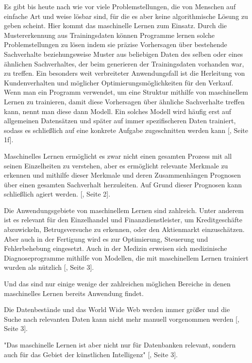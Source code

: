 Es gibt bis heute nach wie vor viele Problemstellungen, die von Menschen auf einfache Art und weise lösbar sind, für die es aber keine algorithmische Lösung zu geben scheint. Hier kommt das maschinelle Lernen zum Einsatz. Durch die Mustererkennung aus Trainingsdaten können Programme lernen solche Problemstellungen zu lösen indem sie präzise Vorhersagen über bestehende Sachverhalte beziehungsweise Muster aus beliebigen Daten des selben oder eines ähnlichen Sachverhaltes, der beim generieren der Trainingsdaten vorhanden war, zu treffen. Ein besonders weit verbreiteter Anwendungsfall ist die Herleitung von Kundenverhalten und möglicher Optimierungsmöglichkeiten für den Verkauf. Wenn man ein Programm verwendet, um eine Struktur mithilfe von maschinellem Lernen zu trainieren, damit diese Vorhersagen über ähnliche Sachverhalte treffen kann, nennt man diese dann Modell. Ein solches Modell wird häufig erst auf allgemeinen Datensätzen und später auf immer spezifischeren Daten trainiert, sodass es schließlich auf eine konkrete Aufgabe zugeschnitten werden kann [\cite{alpaydin_maschinelles_2022}, Seite 1f].

Maschinelles Lernen ermöglicht es zwar nicht einen gesamten Prozess mit all seinen Einzelheiten zu verstehen, aber es ermöglicht relevante Merkmale zu erkennen und mithilfe dieser Merkmale und deren Zusammenhängen Prognosen über einen gesamten Sachverhalt herzuleiten. Auf Grund dieser Prognosen kann schließlich agiert werden. [\cite{alpaydin_maschinelles_2022}, Seite 2].

Die Anwendungsgebiete von maschinellem Lernen sind zahlreich. Unter anderem ist es relevant für den Einzelhandel und Finanzdienstleister, um Kreditgeschäfte abzuwickeln, Betrugsversuche zu erkennen, oder den Aktienmarkt einzuschätzen. Aber auch in der Fertigung wird es zur Optimierung, Steuerung und Fehlerbehebung eingesetzt. Auch in der Medizin erweisen sich medizinische Diagnoseprogramme mithilfe von Modellen, die mit maschinellem Lernen trainiert wurden als nützlich [\cite{alpaydin_maschinelles_2022}, Seite 3].

Und das sind nur einige wenige der zahlreichen möglichen Bereiche in denen maschinelles Lernen bereits Anwendung findet. 

Die Datenbestände und das World Wide Web werden immer größer und die Suche nach relevanten Daten kann nicht mehr manuell vorgenommen werden [\cite{alpaydin_maschinelles_2022}, Seite 3].

"Das maschinelle Lernen ist aber nicht nur für Datenbanken relevant, sondern auch für das Gebiet der künstlichen Intelligenz" [\cite{alpaydin_maschinelles_2022}, Seite 3].

